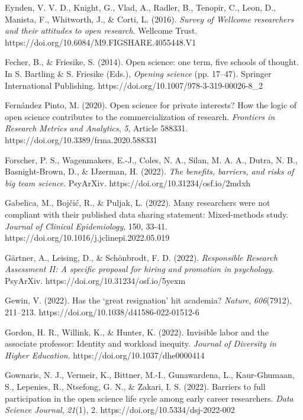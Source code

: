 \documentclass[meta, authordate]{jote-new-article}
\begin{document}
Eynden, V. V. D., Knight, G., Vlad, A., Radler, B., Tenopir, C., Leon, D., Manista, F., Whitworth, J., & Corti, L. (2016). \emph{Survey of Wellcome researchers and their attitudes to open research}. Wellcome Trust. https://doi.org/10.6084/M9.FIGSHARE.4055448.V1



Fecher, B., & Friesike, S. (2014). Open science: one term, five schools of thought. In S. Bartling & S. Friesike (Eds.), \emph{Opening science} (pp. 17–47). Springer International Publishing. https://doi.org/10.1007/978-3-319-00026-8_2



Fernández Pinto, M. (2020). Open science for private interests? How the logic of open science contributes to the commercialization of research. \emph{Frontiers in Research Metrics and Analytics}, \emph{5}, Article 588331. https://doi.org/10.3389/frma.2020.588331



Forscher, P. S., Wagenmakers, E.-J., Coles, N. A., Silan, M. A. A., Dutra, N. B., Basnight-Brown, D., & IJzerman, H. (2022). \emph{The benefits, barriers, and risks of big team science}. PsyArXiv. https://doi.org/10.31234/osf.io/2mdxh



Gabelica, M., Bojčić, R., & Puljak, L. (2022). Many researchers were not compliant with their published data sharing statement: Mixed-methods study. \emph{Journal of Clinical Epidemiology}, 150, 33-41. https://doi.org/10.1016/j.jclinepi.2022.05.019



Gärtner, A., Leising, D., & Schönbrodt, F. D. (2022). \emph{Responsible Research Assessment II: A specific proposal for hiring and promotion in psychology}. PsyArXiv. https://doi.org/10.31234/osf.io/5yexm



Gewin, V. (2022). Has the ‘great resignation’ hit academia? \emph{Nature}, \emph{606}(7912), 211–213. https://doi.org/10.1038/d41586-022-01512-6



Gordon, H. R., Willink, K., & Hunter, K. (2022). Invisible labor and the associate professor: Identity and workload inequity. \emph{Journal of Diversity in Higher Education}. https://doi.org/10.1037/dhe0000414



Gownaris, N. J., Vermeir, K., Bittner, M.-I., Gunawardena, L., Kaur-Ghumaan, S., Lepenies, R., Ntsefong, G. N., & Zakari, I. S. (2022). Barriers to full participation in the open science life cycle among early career researchers. \emph{Data Science Journal}, \emph{21}(1), 2. https://doi.org/10.5334/dsj-2022-002
\end{document}
